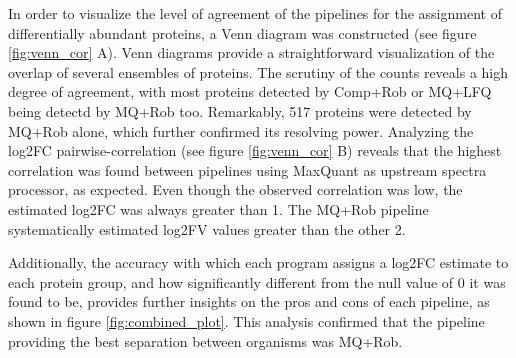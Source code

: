 \documentclass[11pt, a4paper]{report}
\begin{document}
In order to visualize the level of agreement of the pipelines for the assignment of differentially abundant proteins, a Venn diagram was constructed (see figure \ref{fig:venn_cor} A). Venn diagrams provide a straightforward visualization of the overlap of several ensembles of proteins. The scrutiny of the counts reveals a high degree of agreement, with most proteins detected by Comp+Rob or MQ+LFQ being detectd by MQ+Rob too. Remarkably, 517 proteins were detected by MQ+Rob alone, which further confirmed its resolving power. Analyzing the log2FC pairwise-correlation (see figure \ref{fig:venn_cor} B) reveals that the highest correlation was found between pipelines using MaxQuant as upstream spectra processor, as expected. Even though the observed correlation was low, the estimated log2FC was always greater than 1. The MQ+Rob pipeline systematically estimated log2FV values greater than the other 2.


Additionally, the accuracy with which each program assigns a \ac{log2FC} estimate to each protein group, and how significantly different from the null value of 0 it was found to be, provides further insights on the pros and cons of each pipeline, as shown in figure \ref{fig:combined_plot}. This analysis confirmed that the pipeline providing the best separation between organisms was MQ+Rob.
\end{document}
